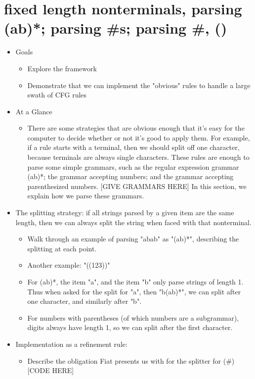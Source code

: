 \section{fixed length nonterminals, parsing (ab)*; parsing \#s; parsing \#, ()}
  \begin{itemize} \item  Goals
    \begin{itemize} \item  Explore the framework 
    \item  Demonstrate that we can implement the "obvious" rules to handle a large swath of CFG rules \end{itemize}
  \item  At a Glance
    \begin{itemize} \item  There are some strategies that are obvious enough that it's easy for the computer to decide whether or not it's good to apply them.  For example, if a rule starts with a terminal, then we should split off one character, because terminals are always single characters.  These rules are enough to parse some simple grammars, such as the regular expression grammar (ab)*; the grammar accepting numbers; and the grammar accepting parenthesized numbers.  {}[GIVE GRAMMARS HERE]  In this section, we explain how we parse these grammars. \end{itemize}
  \item  The splitting strategy: if all strings parsed by a given item are the same length, then we can always split the string when faced with that nonterminal.
    \begin{itemize} \item  Walk through an example of parsing "abab" as "(ab)*", describing the splitting at each point. 
    \item  Another example: "((123))" 
    \item  For (ab)*, the item "a", and the item "b" only parse strings of length 1.  Thus when asked for the split for "a", then "b(ab)*", we can split after one character, and similarly after "b".  
    \item  For numbers with parentheses (of which numbers are a subgrammar), digits always have length 1, so we can split after the first character. \end{itemize}
  \item  Implementation as a refinement rule:
    \begin{itemize} \item  Describe the obligation Fiat presents us with for the splitter for (\#) {}[CODE HERE] 

\end{itemize}
\end{itemize}
